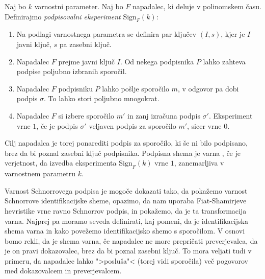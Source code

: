 \begin{definicija}
    Naj bo $k$ varnostni parameter. Naj bo $F$ napadalec, ki deluje v polinomskem času. Definirajmo
    \textit{podpisovalni eksperiment} $\text{Sign}_F(k)$:
    \begin{enumerate}
        \item Na podlagi varnostnega parametra se definira par ključev $(I, s)$, kjer je $I$
            javni ključ, $s$ pa zasebni ključ.
        \item Napadalec $F$ prejme javni ključ $I$. Od nekega podpisnika $P$ lahko zahteva podpise
            poljubno izbranih sporočil.
        \item Napadalec $F$ podpisniku $P$ lahko pošlje sporočilo $m$, v odgovor pa dobi podpis $\sigma$.
            To lahko stori poljubno mnogokrat.
        \item Napadalec $F$ si izbere sporočilo $m'$ in zanj izračuna podpis $\sigma'$. Eksperiment
            vrne $1$, če je podpis $\sigma'$ veljaven podpis za sporočilo $m'$, sicer vrne $0$.
    \end{enumerate}
    Cilj napadalca je torej ponarediti podpis za sporočilo, ki še ni bilo podpisano, brez da bi poznal
    zasebni ključ podpisnika. Podpisna shema je varna , če je verjetnost, da izvedba eksperimenta
    $\text{Sign}_F(k)$ vrne $1$, zanemarljiva v varnostnem parametru $k$.
\end{definicija}

Varnost Schnorrovega podpisa je mogoče dokazati tako, da pokažemo varnost Schnorrove identifikacijske
sheme, opazimo, da nam uporaba Fiat-Shamirjeve hevristike vrne ravno Schnorrov podpis, in pokažemo, da
je ta transformacija varna. Najprej pa moramo seveda definirati, kaj pomeni, da je identifikacijska
shema varna in kako povežemo identifikacijsko shemo s sporočilom. V osnovi bomo rekli, da je shema
varna, če napadalec ne more prepričati preverjevalca, da je on pravi dokazovalec, brez da bi poznal
zasebni ključ. To mora veljati tudi v primeru, da napadalec lahko ">posluša"< (torej vidi sporočila)
več pogovorov med dokazovalcem in preverjevalcem.

